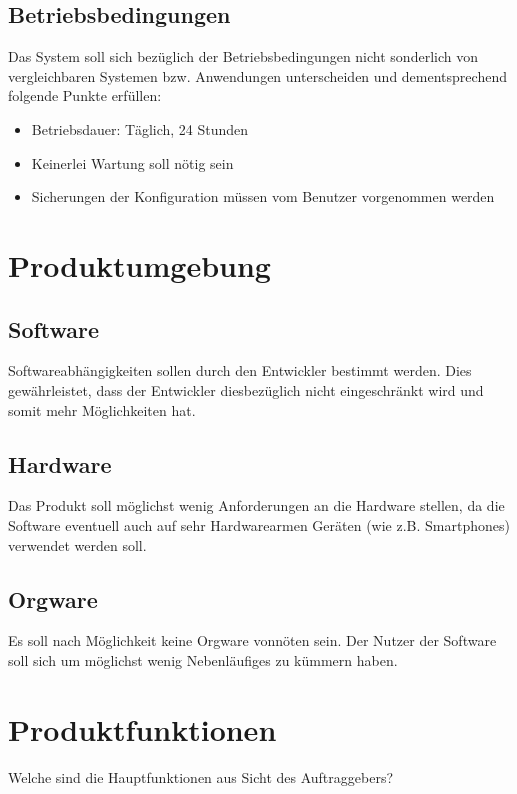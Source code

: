 \subsection{Betriebsbedingungen}
Das System soll sich bezüglich der Betriebsbedingungen nicht sonderlich von vergleichbaren Systemen bzw.
Anwendungen unterscheiden und dementsprechend folgende Punkte erfüllen:
\begin{itemize}
        \item Betriebsdauer: Täglich, 24 Stunden
        \item Keinerlei Wartung soll nötig sein
        \item Sicherungen der Konfiguration müssen vom Benutzer vorgenommen werden
\end{itemize}

\section{Produktumgebung}
\subsection{Software}
Softwareabhängigkeiten sollen durch den Entwickler bestimmt werden.
Dies gewährleistet, dass der Entwickler diesbezüglich nicht eingeschränkt wird
und somit mehr Möglichkeiten hat.

\subsection{Hardware}
Das Produkt soll möglichst wenig Anforderungen an die Hardware stellen, da
die Software eventuell auch auf sehr Hardwarearmen Geräten (wie z.B. Smartphones)
verwendet werden soll.

\subsection{Orgware}
Es soll nach Möglichkeit keine Orgware vonnöten sein. Der Nutzer der Software soll sich
um möglichst wenig Nebenläufiges zu kümmern haben.

\section{Produktfunktionen}
Welche sind die Hauptfunktionen aus Sicht des Auftraggebers?

